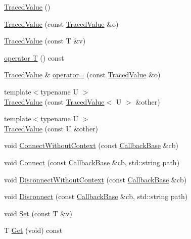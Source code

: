 \begin{DoxyCompactItemize}
\item 
\hyperlink{classns3_1_1TracedValue_ac1f6f49a5b30ac3fe9bd51c7ae3a4973}{Traced\+Value} ()
\item 
\hyperlink{classns3_1_1TracedValue_ab131186a49f6e7ff040bdea448182d20}{Traced\+Value} (const \hyperlink{classns3_1_1TracedValue}{Traced\+Value} \&o)
\item 
\hyperlink{classns3_1_1TracedValue_a2046cb5d5c2898009f32d1b4192f0a12}{Traced\+Value} (const T \&v)
\item 
\hyperlink{classns3_1_1TracedValue_afb34689e4e070248a1ab8c2d471bca8d}{operator T} () const 
\item 
\hyperlink{classns3_1_1TracedValue}{Traced\+Value} \& \hyperlink{classns3_1_1TracedValue_aed153085a31c3a719fea532523416093}{operator=} (const \hyperlink{classns3_1_1TracedValue}{Traced\+Value} \&o)
\item 
{\footnotesize template$<$typename U $>$ }\\\hyperlink{classns3_1_1TracedValue_adc54ad3a1f9aaaec06c358ac4aa0c4b3}{Traced\+Value} (const \hyperlink{classns3_1_1TracedValue}{Traced\+Value}$<$ U $>$ \&other)
\item 
{\footnotesize template$<$typename U $>$ }\\\hyperlink{classns3_1_1TracedValue_ac94dd59a2318e92fc259b52d8e1970df}{Traced\+Value} (const U \&other)
\item 
void \hyperlink{classns3_1_1TracedValue_ab3ce5e2759d5a27756c3424bf7494810}{Connect\+Without\+Context} (const \hyperlink{classns3_1_1CallbackBase}{Callback\+Base} \&cb)
\item 
void \hyperlink{classns3_1_1TracedValue_a7532de2f2780e3e80cd2cae1d06ea060}{Connect} (const \hyperlink{classns3_1_1CallbackBase}{Callback\+Base} \&cb, std\+::string path)
\item 
void \hyperlink{classns3_1_1TracedValue_a623f6be630113fb0f0e51d0c2b208a9a}{Disconnect\+Without\+Context} (const \hyperlink{classns3_1_1CallbackBase}{Callback\+Base} \&cb)
\item 
void \hyperlink{classns3_1_1TracedValue_a7c818b7f58b4802ae7f5109776f40a3d}{Disconnect} (const \hyperlink{classns3_1_1CallbackBase}{Callback\+Base} \&cb, std\+::string path)
\item 
void \hyperlink{classns3_1_1TracedValue_acf89f3954232d083f84dd3c1c95b0277}{Set} (const T \&v)
\item 
T \hyperlink{classns3_1_1TracedValue_a10fddd1de961ac65acfbeb440a1e8551}{Get} (void) const 
\end{DoxyCompactItemize}
